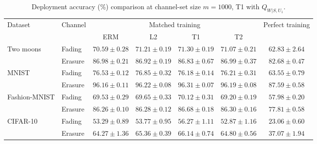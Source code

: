 \begin{table}[htb]
\centering
\caption{Deployment accuracy (\%) comparison at channel-set size $m=1000$, T1 with $Q_{W|S,U_1}$.}
\label{tab:performance}
\begin{tabular*}{\linewidth}{@{\extracolsep{\fill}}llccccc@{}}
\toprule
\multirow{2}{*}{Dataset} & \multirow{2}{*}{Channel}
& \multicolumn{4}{c}{Matched training} & \multirow{2}{*}{Perfect training} \\
\cmidrule(lr){3-6}
& & ERM & L2 & T1 & T2 &  \\
\midrule
\multirow{2}{*}{Two moons}
& Fading
& $70.59\pm0.28$ & $71.21\pm0.19$ & $\mathbf{71.30}\pm0.19$ & $71.07\pm0.21$ & $62.83\pm2.64$ \\
& Erasure
& $86.98\pm0.21$ & $86.92\pm0.19$ & $86.83\pm0.67$ & $\mathbf{86.99}\pm0.37$ & $82.68\pm0.47$ \\
\midrule
\multirow{2}{*}{MNIST}
& Fading
& $76.53\pm0.12$ & $\mathbf{76.85}\pm0.32$ & $76.18\pm0.14$ & $76.21\pm0.31$ & $63.55\pm0.79$ \\
& Erasure
& $96.16\pm0.11$ & $96.22\pm0.08$ & $\mathbf{96.31}\pm0.07$ & $96.19\pm0.08$ & $87.59\pm0.58$ \\
\midrule
\multirow{2}{*}{Fashion-MNIST}
& Fading
& $69.53\pm0.29$ & $69.65\pm0.33$ & $\mathbf{70.12}\pm0.31$ & $69.20\pm0.19$ & $57.98\pm0.20$ \\
& Erasure
& $86.26\pm0.10$ & $86.28\pm0.12$ & $\mathbf{86.68}\pm0.18$ & $86.30\pm0.16$ & $77.81\pm0.58$ \\
\midrule
\multirow{2}{*}{CIFAR-10}
& Fading
& $53.29\pm0.89$ & $53.77\pm0.95$ & $\mathbf{56.27}\pm1.11$ & $52.87\pm1.16$ & $23.06\pm0.60$ \\
& Erasure
& $64.27\pm1.36$ & $65.36\pm0.39$ & $\mathbf{66.14}\pm0.74$ & $64.80\pm0.56$ & $37.07\pm1.94$ \\
\bottomrule
\end{tabular*}
\end{table}
